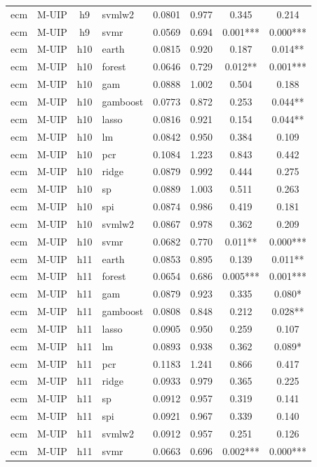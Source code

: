 \begin{ThreePartTable}
\begin{longtable}[t]{llclcccc}
ecm & M-UIP & h9 & svmlw2 & 0.0801 & 0.977 & 0.345 & 0.214\\
ecm & M-UIP & h9 & svmr & 0.0569 & 0.694 & 0.001*** & 0.000***\\
\addlinespace
ecm & M-UIP & h10 & earth & 0.0815 & 0.920 & 0.187 & 0.014**\\
ecm & M-UIP & h10 & forest & 0.0646 & 0.729 & 0.012** & 0.001***\\
ecm & M-UIP & h10 & gam & 0.0888 & 1.002 & 0.504 & 0.188\\
ecm & M-UIP & h10 & gamboost & 0.0773 & 0.872 & 0.253 & 0.044**\\
ecm & M-UIP & h10 & lasso & 0.0816 & 0.921 & 0.154 & 0.044**\\
ecm & M-UIP & h10 & lm & 0.0842 & 0.950 & 0.384 & 0.109\\
ecm & M-UIP & h10 & pcr & 0.1084 & 1.223 & 0.843 & 0.442\\
ecm & M-UIP & h10 & ridge & 0.0879 & 0.992 & 0.444 & 0.275\\
ecm & M-UIP & h10 & sp & 0.0889 & 1.003 & 0.511 & 0.263\\
ecm & M-UIP & h10 & spi & 0.0874 & 0.986 & 0.419 & 0.181\\
ecm & M-UIP & h10 & svmlw2 & 0.0867 & 0.978 & 0.362 & 0.209\\
ecm & M-UIP & h10 & svmr & 0.0682 & 0.770 & 0.011** & 0.000***\\
\addlinespace
ecm & M-UIP & h11 & earth & 0.0853 & 0.895 & 0.139 & 0.011**\\
ecm & M-UIP & h11 & forest & 0.0654 & 0.686 & 0.005*** & 0.001***\\
ecm & M-UIP & h11 & gam & 0.0879 & 0.923 & 0.335 & 0.080*\\
ecm & M-UIP & h11 & gamboost & 0.0808 & 0.848 & 0.212 & 0.028**\\
ecm & M-UIP & h11 & lasso & 0.0905 & 0.950 & 0.259 & 0.107\\
ecm & M-UIP & h11 & lm & 0.0893 & 0.938 & 0.362 & 0.089*\\
ecm & M-UIP & h11 & pcr & 0.1183 & 1.241 & 0.866 & 0.417\\
ecm & M-UIP & h11 & ridge & 0.0933 & 0.979 & 0.365 & 0.225\\
ecm & M-UIP & h11 & sp & 0.0912 & 0.957 & 0.319 & 0.141\\
ecm & M-UIP & h11 & spi & 0.0921 & 0.967 & 0.339 & 0.140\\
ecm & M-UIP & h11 & svmlw2 & 0.0912 & 0.957 & 0.251 & 0.126\\
ecm & M-UIP & h11 & svmr & 0.0663 & 0.696 & 0.002*** & 0.000***\\

\end{longtable}
\end{ThreePartTable}
